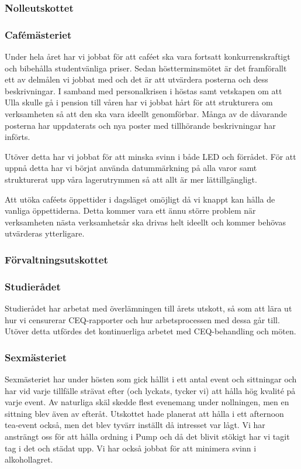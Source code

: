 \documentclass[../_main/handlingar.tex]{subfiles}
\begin{document}
\subsubsection*{Nolleutskottet}

\subsubsection*{Cafémästeriet}
Under hela året har vi jobbat för att caféet ska vara fortsatt konkurrenskraftigt och bibehålla studentvänliga priser. Sedan höstterminsmötet är det framförallt ett av delmålen vi jobbat med och det är att utvärdera posterna och dess beskrivningar. I samband med personalkrisen i höstas samt vetskapen om att Ulla skulle gå i pension till våren har vi jobbat hårt för att strukturera om verksamheten så att den ska vara ideellt genomförbar. Många av de dåvarande posterna har uppdaterats och nya poster med tillhörande beskrivningar har införts.

Utöver detta har vi jobbat för att minska svinn i både LED och förrådet. För att uppnå detta har vi börjat använda datummärkning på alla varor samt strukturerat upp våra lagerutrymmen så att allt är mer lättillgängligt.

Att utöka caféets öppettider i dagsläget omöjligt då vi knappt kan hålla de vanliga öppettiderna. Detta kommer vara ett ännu större problem när verksamheten nästa verksamhetsår ska drivas helt ideellt och kommer behövas utvärderas ytterligare.

\subsubsection*{Förvaltningsutskottet}

\subsubsection*{Studierådet}
Studierådet har arbetat med överlämningen till årets utskott, så som att lära ut hur vi censurerar CEQ-rapporter och hur arbetsprocessen med dessa går till. Utöver detta utfördes det kontinuerliga arbetet med CEQ-behandling och möten.

\subsubsection*{Sexmästeriet}
Sexmästeriet har under hösten som gick hållit i ett antal event och sittningar och har vid varje tillfälle strävat efter (och lyckats, tycker vi) att hålla hög kvalité på varje event. Av naturliga skäl skedde flest evenemang under nollningen, men en sittning blev även av efteråt. Utskottet hade planerat att hålla i ett afternoon tea-event också, men det blev tyvärr inställt då intresset var lågt. Vi har ansträngt oss för att hålla ordning i Pump och då det blivit stökigt har vi tagit tag i det och städat upp. Vi har också jobbat för att minimera svinn i alkohollagret.
\end{document}
